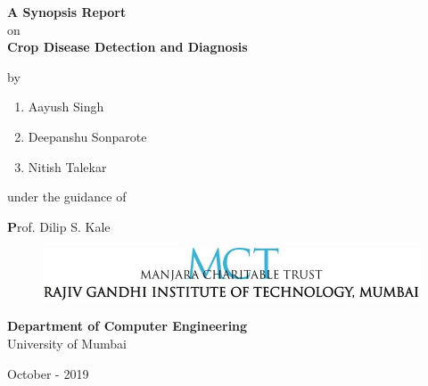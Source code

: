 \begin{titlepage}
\vspace*{0.025cm}
{\centering
\large
{\textbf {A Synopsis Report}}\\
on\\
\vspace{0.90cm}
{\Large\textbf {Crop Disease Detection and Diagnosis}} \\
\vspace{0.65cm}

by\\
\vspace{0.65cm}
\begin{enumerate}
\item \begin{center}Aayush Singh\end{center}
\item \begin{center}Deepanshu Sonparote\end{center}
\item \begin{center}Nitish Talekar\end{center}
\end{enumerate}

\vspace{2cm}
\begin{center}under the guidance of\end{center}
\vspace{0.3cm}
\hspace{.05cm} \begin{center}{\large \textbf Prof. Dilip S. Kale}\end{center}
\vspace{3cm}

\begin{figure}[h]
\centering
\includegraphics[scale=0.8]{college_logo.jpg}
\end{figure}
\hspace{.05cm}
\hspace{.05cm}
\vspace{0.0cm}
\begin{center}
\textbf {Department of Computer Engineering}\\
\vspace{0.35cm}
University of Mumbai\end{center}
\vspace{0.35cm}
\hspace{6.75cm}October - 2019}\\
\end{titlepage}
\newpage

